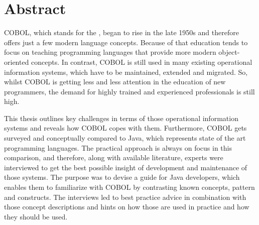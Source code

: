 \chapter*{Abstract} 

COBOL, which stands for the , began to rise in the late 1950s and therefore offers just a few modern language concepts. Because of that education tends to focus on teaching programming languages that provide more modern object-oriented concepts. In contrast, COBOL is still used in many existing operational information systems, which have to be maintained, extended and migrated. So, whilst COBOL is getting less and less attention in the education of new programmers, the demand for highly trained and experienced professionals is still high. 

This thesis outlines key challenges in terms of those operational information systems and reveals how COBOL copes with them. Furthermore, COBOL gets surveyed and conceptually compared to Java, which represents state of the art programming languages. The practical approach is always on focus in this comparison, and therefore, along with available literature, experts were interviewed to get the best possible insight of development and maintenance of those systems. The purpose was to devise a guide for Java developers, which enables them to familiarize with COBOL by contrasting known concepts, pattern and constructs. The interviews led to best practice advice in combination with those concept descriptions and hints on how those are used in practice and how they should be used.